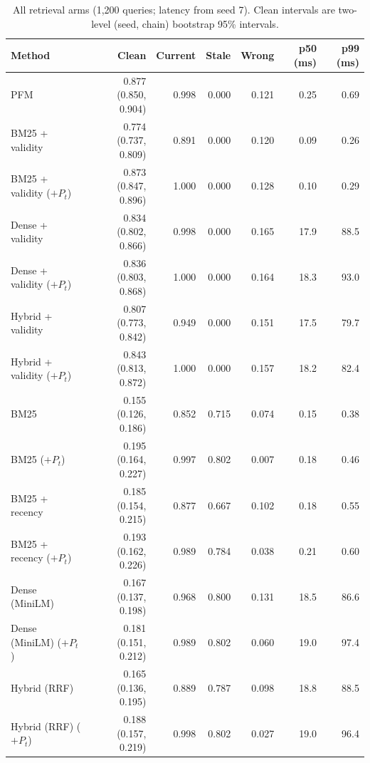 \documentclass{article} %
\begin{document}
\begin{table}[h]
\centering
\scriptsize
\setlength{\tabcolsep}{3pt}
\begin{tabular}{@{}lrrrrrr@{}}
\toprule
Method & Clean & Current & Stale & Wrong & p50 (ms) & p99 (ms) \\
\midrule
PFM & 0.877 {\scriptsize(0.850, 0.904)} & 0.998 & 0.000 & 0.121 & 0.25 & 0.69 \\
BM25 + validity & 0.774 {\scriptsize(0.737, 0.809)} & 0.891 & 0.000 & 0.120 & 0.09 & 0.26 \\
BM25 + validity ($+P_t$) & 0.873 {\scriptsize(0.847, 0.896)} & 1.000 & 0.000 & 0.128 & 0.10 & 0.29 \\
Dense + validity & 0.834 {\scriptsize(0.802, 0.866)} & 0.998 & 0.000 & 0.165 & 17.9 & 88.5 \\
Dense + validity ($+P_t$) & 0.836 {\scriptsize(0.803, 0.868)} & 1.000 & 0.000 & 0.164 & 18.3 & 93.0 \\
Hybrid + validity & 0.807 {\scriptsize(0.773, 0.842)} & 0.949 & 0.000 & 0.151 & 17.5 & 79.7 \\
Hybrid + validity ($+P_t$) & 0.843 {\scriptsize(0.813, 0.872)} & 1.000 & 0.000 & 0.157 & 18.2 & 82.4 \\
\midrule
BM25 & 0.155 {\scriptsize(0.126, 0.186)} & 0.852 & 0.715 & 0.074 & 0.15 & 0.38 \\
BM25 ($+P_t$) & 0.195 {\scriptsize(0.164, 0.227)} & 0.997 & 0.802 & 0.007 & 0.18 & 0.46 \\
BM25 + recency & 0.185 {\scriptsize(0.154, 0.215)} & 0.877 & 0.667 & 0.102 & 0.18 & 0.55 \\
BM25 + recency ($+P_t$) & 0.193 {\scriptsize(0.162, 0.226)} & 0.989 & 0.784 & 0.038 & 0.21 & 0.60 \\
Dense (MiniLM) & 0.167 {\scriptsize(0.137, 0.198)} & 0.968 & 0.800 & 0.131 & 18.5 & 86.6 \\
Dense (MiniLM) ($+P_t$) & 0.181 {\scriptsize(0.151, 0.212)} & 0.989 & 0.802 & 0.060 & 19.0 & 97.4 \\
Hybrid (RRF) & 0.165 {\scriptsize(0.136, 0.195)} & 0.889 & 0.787 & 0.098 & 18.8 & 88.5 \\
Hybrid (RRF) ($+P_t$) & 0.188 {\scriptsize(0.157, 0.219)} & 0.998 & 0.802 & 0.027 & 19.0 & 96.4 \\
\bottomrule
\end{tabular}
\caption{All retrieval arms (1{,}200 queries; latency from seed 7). Clean intervals are two-level (seed, chain) bootstrap 95\% intervals.}
\label{tab:full}
\end{table}
\end{document}
